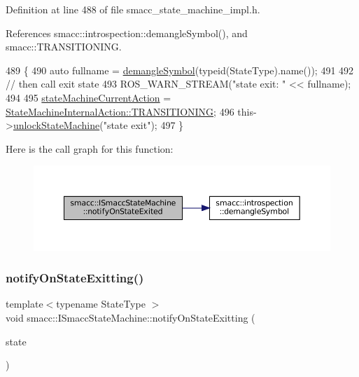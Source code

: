 Definition at line 488 of file smacc\+\_\+state\+\_\+machine\+\_\+impl.\+h.



References smacc\+::introspection\+::demangle\+Symbol(), and smacc\+::\+T\+R\+A\+N\+S\+I\+T\+I\+O\+N\+I\+NG.


\begin{DoxyCode}
489   \{
490     \textcolor{keyword}{auto} fullname = \hyperlink{namespacesmacc_1_1introspection_a2f495108db3e57604d8d3ff5ef030302}{demangleSymbol}(\textcolor{keyword}{typeid}(StateType).name());
491 
492     \textcolor{comment}{// then call exit state}
493     ROS\_WARN\_STREAM(\textcolor{stringliteral}{"state exit: "} << fullname);
494 
495     \hyperlink{classsmacc_1_1ISmaccStateMachine_a654a98ba86c4c1013ac3c371f293d950}{stateMachineCurrentAction} = 
      \hyperlink{namespacesmacc_a0889aff43c93fe5285109819d2898144a5e174e130ee1847f37541ba5786207a3}{StateMachineInternalAction::TRANSITIONING};
496     this->\hyperlink{classsmacc_1_1ISmaccStateMachine_ae2e3ceb87bfe3f9d8bf320e36071fdc7}{unlockStateMachine}(\textcolor{stringliteral}{"state exit"});
497   \}
\end{DoxyCode}
Here is the call graph for this function\+:
\nopagebreak
\begin{figure}[H]
\begin{center}
\leavevmode
\includegraphics[width=350pt]{classsmacc_1_1ISmaccStateMachine_ac352013a5df0dcce0594f1466b9a6f7b_cgraph}
\end{center}
\end{figure}
\mbox{\label{classsmacc_1_1ISmaccStateMachine_a707c36f8b02eeed1af624dd36a5a4957}} 
\subsubsection{\texorpdfstring{notify\+On\+State\+Exitting()}{notifyOnStateExitting()}}
{\footnotesize\ttfamily template$<$typename State\+Type $>$ \\
void smacc\+::\+I\+Smacc\+State\+Machine\+::notify\+On\+State\+Exitting (\begin{DoxyParamCaption}\item[{State\+Type $\ast$}]{state }\end{DoxyParamCaption})}



